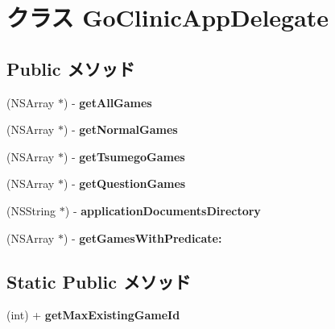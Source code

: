 \hypertarget{interface_go_clinic_app_delegate}{
\section{クラス GoClinicAppDelegate}
\label{interface_go_clinic_app_delegate}
}
\subsection*{Public メソッド}
\begin{DoxyCompactItemize}
\item 
\hypertarget{interface_go_clinic_app_delegate_a21129e1491b4c7ef7eb9c1c7b5886698}{
(NSArray $\ast$) -\/ {\bfseries getAllGames}}
\label{interface_go_clinic_app_delegate_a21129e1491b4c7ef7eb9c1c7b5886698}

\item 
\hypertarget{interface_go_clinic_app_delegate_a5c34c97840fa37539b669ca41093622b}{
(NSArray $\ast$) -\/ {\bfseries getNormalGames}}
\label{interface_go_clinic_app_delegate_a5c34c97840fa37539b669ca41093622b}

\item 
\hypertarget{interface_go_clinic_app_delegate_a85cd07d46b0f198b149181474e996e91}{
(NSArray $\ast$) -\/ {\bfseries getTsumegoGames}}
\label{interface_go_clinic_app_delegate_a85cd07d46b0f198b149181474e996e91}

\item 
\hypertarget{interface_go_clinic_app_delegate_a65aa362611da5b0e2493fe686eac1de9}{
(NSArray $\ast$) -\/ {\bfseries getQuestionGames}}
\label{interface_go_clinic_app_delegate_a65aa362611da5b0e2493fe686eac1de9}

\item 
\hypertarget{interface_go_clinic_app_delegate_a087ecbf65e4aca2a528d81054640df81}{
(NSString $\ast$) -\/ {\bfseries applicationDocumentsDirectory}}
\label{interface_go_clinic_app_delegate_a087ecbf65e4aca2a528d81054640df81}

\item 
\hypertarget{interface_go_clinic_app_delegate_a63108c99e4d0a18f7836468bf9708632}{
(NSArray $\ast$) -\/ {\bfseries getGamesWithPredicate:}}
\label{interface_go_clinic_app_delegate_a63108c99e4d0a18f7836468bf9708632}

\end{DoxyCompactItemize}
\subsection*{Static Public メソッド}
\begin{DoxyCompactItemize}
\item 
\hypertarget{interface_go_clinic_app_delegate_aeedcf04d80680ad09b442f8b673d5c53}{
(int) + {\bfseries getMaxExistingGameId}}
\label{interface_go_clinic_app_delegate_aeedcf04d80680ad09b442f8b673d5c53}

\end{DoxyCompactItemize}
